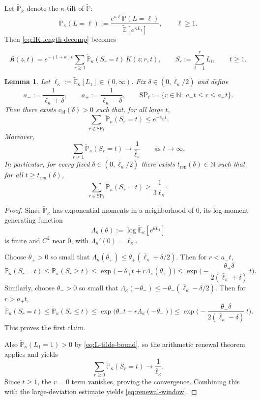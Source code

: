 \documentclass[letterpaper,11pt,reqno]{amsart}
\newtheorem{lem}[thm]{Lemma}
\theoremstyle{definition}
\newcommand{\IK}{\mathfrak{K}}
\begin{document}
Let \(\tilde{\mathbb P}_\kappa\) denote the \(\kappa\)-tilt of \(\tilde{\mathbb P}\):
\[
\tilde{\mathbb P}_\kappa(L=\ell)
:=
\frac{e^{\kappa\ell}\tilde{\mathbb P}(L=\ell)}
{\tilde{\mathbb E}[e^{\kappa L_1}]},
\qquad \ell\ge1.
\]
Then \eqref{eq:IK-length-decomp} becomes

\begin{equation}\label{eq:IK-tilt}
\IK(z,t)=e^{-(1+\kappa)t}\sum_{r\ge 1}\tilde{\mathbb P}_\kappa(S_r=t)\,K(z;r,t),
\qquad S_r:=\sum_{i=1}^r L_i,\qquad t\ge1.
\end{equation}


\begin{lem}\label{lem:LDP}
Let $\bar\ell_\kappa:=\tilde{\mathbb E}_\kappa[L_1]\in(0,\infty)$.
Fix $\delta\in(0,\bar\ell_\kappa/2)$ and define
\begin{equation*} 
a_-:=\frac{1}{\bar\ell_\kappa+\delta},
\qquad
a_+:=\frac{1}{\bar\ell_\kappa-\delta},
\qquad
\mathrm{SP}_t:=\big\{r\in\mathbb N:\ a_-t\le r\le a_+t\big\}.
\end{equation*}
Then there exists \(c_{\mathrm{ld}}(\delta)>0\) such that, for all large \(t\),
\[
    \sum_{r\notin\mathrm{SP}_t}
    \widetilde{\mathbb P}_\kappa(S_r=t)
    \le e^{-c_{\mathrm{ld}}t}.
\]
Moreover,
\[
\sum_{r\ge1}\tilde{\mathbb P}_\kappa(S_r=t)\longrightarrow \frac{1}{\bar\ell_\kappa}
\qquad\text{as }t\to\infty.
\]
In particular, for every fixed $\delta\in(0,\bar\ell_\kappa/2)$ there exists $t_{\mathrm{ren}}(\delta)\in\mathbb N$ such that for all $t\ge t_{\mathrm{ren}}(\delta)$,
\begin{equation}\label{eq:renewal-window}
\sum_{r\in\mathrm{SP}_t}\tilde{\mathbb P}_\kappa(S_r=t)\ge \frac{1}{3\bar\ell_\kappa}.
\end{equation}
\end{lem}
\begin{proof}
Since \(\tilde{\mathbb P}_\kappa\) has exponential moments in a neighborhood of \(0\), its log-moment generating function
\[
\Lambda_\kappa(\theta):=\log \tilde{\mathbb E}_\kappa[e^{\theta L_1}]
\]
is finite and \(C^2\) near \(0\), with \(\Lambda_\kappa'(0)=\bar\ell_\kappa\).

Choose \(\theta_+>0\) so small that \(\Lambda_\kappa(\theta_+)\le \theta_+(\bar\ell_\kappa+\delta/2)\). Then for \(r<a_-t\),
\[
\tilde{\mathbb P}_\kappa(S_r=t)\le \tilde{\mathbb P}_\kappa(S_r\ge t)
\le
\exp\!\Big(-\theta_+ t+r\Lambda_\kappa(\theta_+)\Big)
\le
\exp\!\Big(-\frac{\theta_+\delta}{2(\bar\ell_\kappa+\delta)}\,t\Big).
\]
Similarly, choose \(\theta_->0\) so small that \(\Lambda_\kappa(-\theta_-)\le -\theta_-(\bar\ell_\kappa-\delta/2)\). Then for \(r>a_+t\),
\[
\tilde{\mathbb P}_\kappa(S_r=t)\le \tilde{\mathbb P}_\kappa(S_r\le t)
\le
\exp\!\Big(\theta_- t+r\Lambda_\kappa(-\theta_-)\Big)
\le
\exp\!\Big(-\frac{\theta_-\delta}{2(\bar\ell_\kappa-\delta)}\,t\Big).
\]
This proves the first claim.

Also \(\tilde{\mathbb P}_\kappa(L_1=1)>0\) by \eqref{eq:L-tilde-bound}, so the arithmetic renewal theorem applies and yields
\[
\sum_{r\ge0}\tilde{\mathbb P}_\kappa(S_r=t)\longrightarrow \frac{1}{\bar\ell_\kappa}.
\]
Since \(t\ge1\), the \(r=0\) term vanishes, proving the convergence. Combining this with the large-deviation estimate yields \eqref{eq:renewal-window}.
\end{proof}
\end{document}
